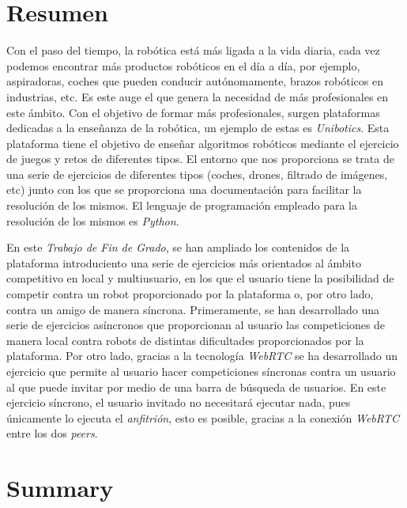 \documentclass[a4paper, 12pt]{book}
\begin{document}

\chapter*{Resumen}


Con el paso del tiempo, la robótica está más ligada a la vida diaria, cada vez podemos encontrar más productos robóticos en el día a día, por ejemplo, aspiradoras, coches que pueden conducir autónomamente, brazos robóticos en industrias, etc. Es este auge el que genera la necesidad de más profesionales en este ámbito. Con el objetivo de formar más profesionales, surgen plataformas dedicadas a la enseñanza de la robótica, un ejemplo de estas es \emph{Unibotics}. Esta plataforma tiene el objetivo de enseñar algoritmos robóticos mediante el ejercicio de juegos y retos de diferentes tipos. El entorno que nos proporciona se trata de una serie de ejercicios de diferentes tipos (coches, drones, filtrado de imágenes, etc) junto con los que se proporciona una documentación para facilitar la resolución de los mismos. El lenguaje de programación empleado para la resolución de los mismos es \emph{Python}.

En este \emph{Trabajo de Fin de Grado}, se han ampliado los contenidos de la plataforma introduciento una serie de ejercicios más orientados al ámbito competitivo en local y multiusuario, en los que el usuario tiene la posibilidad de competir contra un robot proporcionado por la plataforma o, por otro lado, contra un amigo de manera síncrona. Primeramente, se han desarrollado una serie de ejercicios asíncronos que proporcionan al usuario las competiciones de manera local contra robots de distintas dificultades proporcionados por la plataforma. Por otro lado, gracias a la tecnología \emph{WebRTC} se ha desarrollado un ejercicio que permite al usuario hacer competiciones síncronas contra un usuario al que puede invitar por medio de una barra de búsqueda de usuarios. En este ejercicio síncrono, el usuario invitado no necesitará ejecutar nada, pues únicamente lo ejecuta el \emph{anfitrión}, esto es posible, gracias a la conexión \emph{WebRTC} entre los dos \emph{peers}.


\chapter*{Summary}
\end{document}
